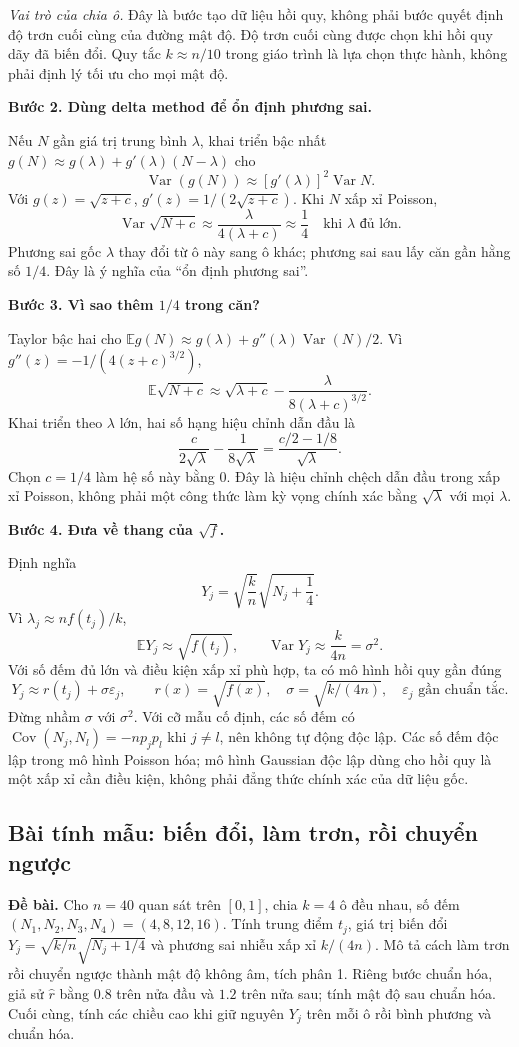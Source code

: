 \documentclass[11pt,a4paper]{article}
\newcommand{\E}{\mathbb E}
\DeclareMathOperator{\Var}{Var}
\newcommand{\buoc}[1]{\par\medskip\textbf{#1}\par}
\begin{document}
\textit{Vai trò của chia ô.} Đây là bước tạo dữ liệu hồi quy, không phải bước quyết định độ trơn cuối cùng của đường mật độ. Độ trơn cuối cùng được chọn khi hồi quy dãy đã biến đổi. Quy tắc $k\approx n/10$ trong giáo trình là lựa chọn thực hành, không phải định lý tối ưu cho mọi mật độ.

\buoc{Bước 2. Dùng delta method để ổn định phương sai.}
Nếu $N$ gần giá trị trung bình $\lambda$, khai triển bậc nhất
$g(N)\approx g(\lambda)+g'(\lambda)(N-\lambda)$ cho
\[
\Var(g(N))\approx[g'(\lambda)]^2\Var N.
\]
Với $g(z)=\sqrt{z+c}$, $g'(z)=1/(2\sqrt{z+c})$. Khi $N$ xấp xỉ Poisson,
\[
\Var\sqrt{N+c}\approx\frac{\lambda}{4(\lambda+c)}\approx\frac14
\quad\text{khi }\lambda\text{ đủ lớn}.
\]
Phương sai gốc $\lambda$ thay đổi từ ô này sang ô khác; phương sai sau lấy căn gần hằng số $1/4$. Đây là ý nghĩa của ``ổn định phương sai''.

\buoc{Bước 3. Vì sao thêm $1/4$ trong căn?}
Taylor bậc hai cho $\E g(N)\approx g(\lambda)+g''(\lambda)\Var(N)/2$. Vì $g''(z)=-1/(4(z+c)^{3/2})$,
\[
\E\sqrt{N+c}\approx\sqrt{\lambda+c}-\frac{\lambda}{8(\lambda+c)^{3/2}}.
\]
Khai triển theo $\lambda$ lớn, hai số hạng hiệu chỉnh dẫn đầu là
\[
\frac{c}{2\sqrt\lambda}-\frac1{8\sqrt\lambda}
=\frac{c/2-1/8}{\sqrt\lambda}.
\]
Chọn $c=1/4$ làm hệ số này bằng 0. Đây là hiệu chỉnh chệch dẫn đầu trong xấp xỉ Poisson, không phải một công thức làm kỳ vọng chính xác bằng $\sqrt\lambda$ với mọi $\lambda$.

\buoc{Bước 4. Đưa về thang của $\sqrt f$.}
Định nghĩa
\[
\boxed{Y_j=\sqrt{\frac{k}{n}}\sqrt{N_j+\frac14}.}
\]
Vì $\lambda_j\approx nf(t_j)/k$,
\[
\E Y_j\approx\sqrt{f(t_j)},\qquad
\Var Y_j\approx\frac{k}{4n}=\sigma^2.
\]
Với số đếm đủ lớn và điều kiện xấp xỉ phù hợp, ta có mô hình hồi quy gần đúng
\[
\boxed{Y_j\approx r(t_j)+\sigma\varepsilon_j,\qquad
r(x)=\sqrt{f(x)},\quad\sigma=\sqrt{k/(4n)},\quad
\varepsilon_j\text{ gần chuẩn tắc}.}
\]
Đừng nhầm $\sigma$ với $\sigma^2$. Với cỡ mẫu cố định, các số đếm có $\operatorname{Cov}(N_j,N_l)=-np_jp_l$ khi $j\ne l$, nên không tự động độc lập. Các số đếm độc lập trong mô hình Poisson hóa; mô hình Gaussian độc lập dùng cho hồi quy là một xấp xỉ cần điều kiện, không phải đẳng thức chính xác của dữ liệu gốc.

\subsection{Bài tính mẫu: biến đổi, làm trơn, rồi chuyển ngược}
\textbf{Đề bài.} Cho $n=40$ quan sát trên $[0,1]$, chia $k=4$ ô đều nhau,
số đếm $(N_1,N_2,N_3,N_4)=(4,8,12,16)$.
Tính trung điểm $t_j$, giá trị biến đổi $Y_j=\sqrt{k/n}\sqrt{N_j+1/4}$
và phương sai nhiễu xấp xỉ $k/(4n)$.
Mô tả cách làm trơn rồi chuyển ngược thành mật độ không âm, tích phân 1.
Riêng bước chuẩn hóa, giả sử $\widehat r$ bằng $0.8$ trên nửa đầu và $1.2$ trên nửa sau;
tính mật độ sau chuẩn hóa. Cuối cùng, tính các chiều cao khi giữ nguyên $Y_j$ trên mỗi ô rồi bình phương và chuẩn hóa.
\end{document}
